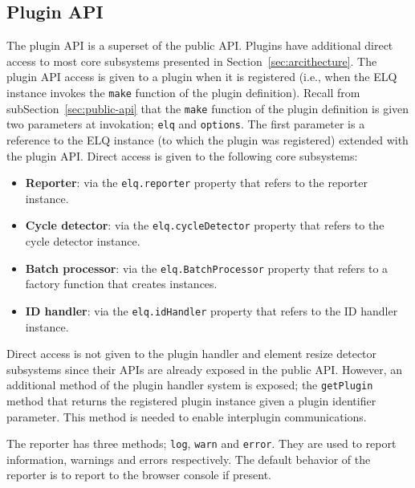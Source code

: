 \documentclass[a4paper,11pt]{kth-mag}
\newcommand{\code}[1]{\texttt{#1}}
\newcommand\abbr[2][]{\uppercase{#2}\ifthenelse{\equal{#1}{}}%
                     {}{#1}}
\begin{document}
      \subsection{Plugin API}\label{sec:plugin-api}
        The plugin \gls{API} is a superset of the public \gls{API}.
        Plugins have additional direct access to most core subsystems presented in Section~\ref{sec:arcithecture}.
        The plugin \gls{API} access is given to a plugin when it is registered (i.e., when the \gls{ELQ} instance invokes the \code{make} function of the plugin definition).
        Recall from subSection~\ref{sec:public-api} that the \code{make} function of the plugin definition is given two parameters at invokation; \code{elq} and \code{options}.
        The first parameter is a reference to the \gls{ELQ} instance (to which the plugin was registered) extended with the plugin \gls{API}.
        Direct access is given to the following core subsystems:
        \begin{itemize}
          \item \textbf{Reporter}: via the \code{elq.reporter} property that refers to the reporter instance.
          \item \textbf{Cycle detector}: via the \code{elq.cycleDetector} property that refers to the cycle detector instance.
          \item \textbf{Batch processor}: via the \code{elq.BatchProcessor} property that refers to a factory function that creates  instances.
          \item \textbf{\abbr{ID} handler}: via the \code{elq.idHandler} property that refers to the \abbr{ID} handler instance. 
        \end{itemize}
        Direct access is not given to the plugin handler and element resize detector subsystems since their \glspl{API} are already exposed in the public \gls{API}.
        However, an additional method of the plugin handler system is exposed; the \code{getPlugin} method that returns the registered plugin instance given a plugin identifier parameter.
        This method is needed to enable interplugin communications.

        The reporter has three methods; \code{log}, \code{warn} and \code{error}.
        They are used to report information, warnings and errors respectively.
        The default behavior of the reporter is to report to the browser console if present.
\end{document}
